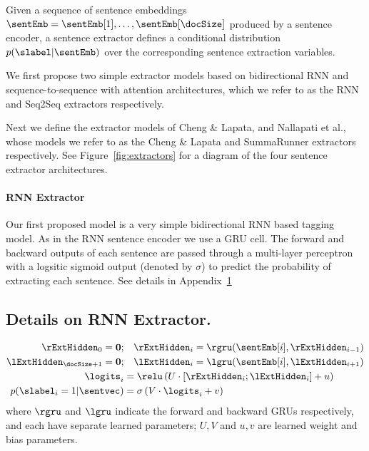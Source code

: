 Given a sequence of sentence embeddings $\sentEmb = \sentEmb[1], \ldots, \sentEmb[\docSize]$ produced by a sentence encoder, 
a sentence extractor defines a conditional distribution $p(\slabel|\sentEmb)$
over the corresponding sentence extraction variables.

We first propose two simple extractor models based on bidirectional RNN 
and sequence-to-sequence with attention architectures, 
which we refer to as the RNN and 
Seq2Seq extractors respectively.

Next we define the extractor models of Cheng \& Lapata, and Nallapati et al.,
whose models we refer to as the Cheng \& Lapata and SummaRunner extractors
respectively.
See Figure~\ref{fig:extractors} for a diagram of the 
four sentence extractor architectures.




\paragraph{RNN Extractor}
    Our first proposed model is a very simple bidirectional
RNN based tagging model. As in the RNN sentence encoder we use a GRU cell.
The  forward and backward outputs of each sentence are passed through a 
multi-layer perceptron with a logsitic sigmoid output (denoted by $\sigma$)
to predict the probability
of extracting each sentence. See details in Appendix~\ref{app:rnnextractor}

\begin{toappendix}
\section{Details on RNN Extractor.} \label{app:rnnextractor}
\begin{align}
    \rExtHidden_0 = \mathbf{0};&\quad   \rExtHidden_i = \rgru(\sentEmb[i], \rExtHidden_{i-1}) \\
    \lExtHidden_{\docSize + 1} = \mathbf{0};&\quad    \lExtHidden_i = \lgru(\sentEmb[i], \lExtHidden_{i+1}) \\
   \logits_i &= \relu\left(U \cdot [\rExtHidden_i; \lExtHidden_i] + u \right)\\
   p(\slabel_i=1|\sentvec) &= \sigma\left(V\cdot \logits_i + v  \right)
\end{align}
where $\rgru$ and $\lgru$ indicate the 
forward and backward GRUs respectively, and each have separate learned 
parameters; $U, V$ and $u, v$ are learned weight and bias parameters.
\end{toappendix}

